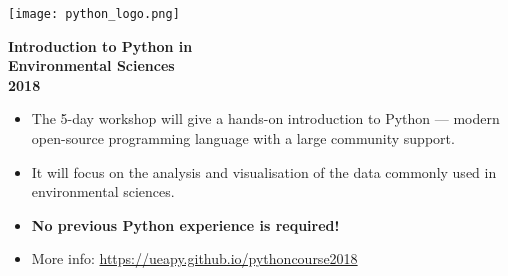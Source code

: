 \documentclass[paper=a4]{scrartcl}
\newcommand*{\pyitem}{\item [{\texttt{[image: python\_logo.png]}}]}
\begin{document}
\pagestyle{empty} %

\begin{center}
\begin{minipage}{0.2\linewidth}
    \texttt{[image: python\_logo.png]}
    \vspace{0.5cm}
\end{minipage}

\Huge \textbf{Introduction to Python in \\ Environmental Sciences \\ 2018}

\end{center}

\begin{itemize}
\pyitem The 5-day workshop will give a hands-on introduction to Python --- modern open-source programming language with a large community support.
\pyitem It will focus on the analysis and visualisation of the data commonly used in environmental sciences.
\pyitem \textbf{No previous Python experience is required!}
\pyitem More info: \url{https://ueapy.github.io/pythoncourse2018}
\end{itemize}


% 
% 
\end{document}
